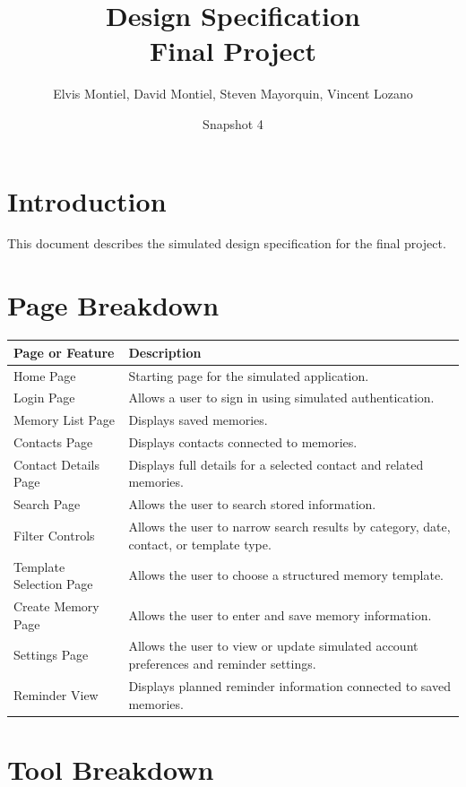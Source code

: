 \documentclass{article}
\title{Design Specification\\Final Project}
\author{Elvis Montiel, David Montiel, Steven Mayorquin, Vincent Lozano}
\date{Snapshot 4}
\begin{document}
\maketitle
\tableofcontents
\newpage

\section{Introduction}

This document describes the simulated design specification for the final project.

\section{Page Breakdown}

\begin{longtable}{|p{4cm}|p{9cm}|}
\hline
Page or Feature & Description \\ \hline
Home Page & Starting page for the simulated application. \\ \hline
Login Page & Allows a user to sign in using simulated authentication. \\ \hline
Memory List Page & Displays saved memories. \\ \hline
Contacts Page & Displays contacts connected to memories. \\ \hline
Contact Details Page & Displays full details for a selected contact and related memories. \\ \hline
Search Page & Allows the user to search stored information. \\ \hline
Filter Controls & Allows the user to narrow search results by category, date, contact, or template type. \\ \hline
Template Selection Page & Allows the user to choose a structured memory template. \\ \hline
Create Memory Page & Allows the user to enter and save memory information. \\ \hline
Settings Page & Allows the user to view or update simulated account preferences and reminder settings. \\ \hline
Reminder View & Displays planned reminder information connected to saved memories. \\ \hline
\end{longtable}

\section{Tool Breakdown}
\end{document}
